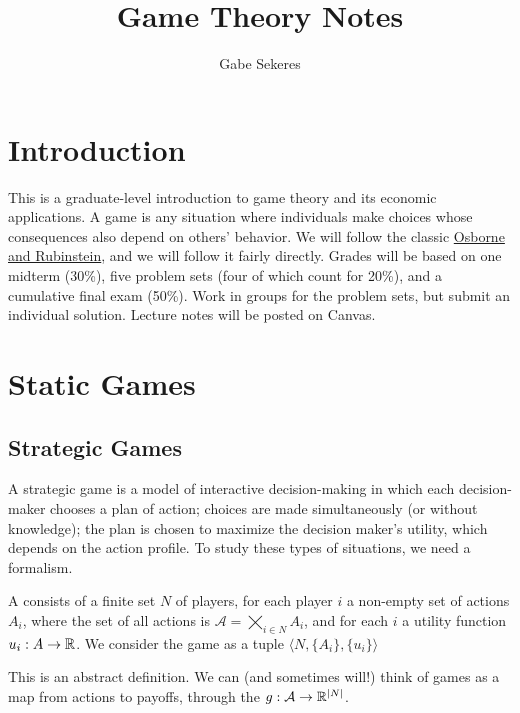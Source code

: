 \documentclass[10pt]{article}
\title{Game Theory Notes}
\author{Gabe Sekeres}
\begin{document}
\maketitle

\tableofcontents
\newpage


\section*{Introduction}

This is a graduate-level introduction to game theory and its economic applications. A game is any situation where individuals make choices whose consequences also depend on others' behavior. We will follow the classic \href{https://mitpress.mit.edu/9780262650403/a-course-in-game-theory/}{Osborne and Rubinstein}, and we will follow it fairly directly. Grades will be based on one midterm (30\%), five problem sets (four of which count for 20\%), and a cumulative final exam (50\%). Work in groups for the problem sets, but submit an individual solution. Lecture notes will be posted on Canvas.

\section{Static Games}

\subsection{Strategic Games}

A strategic game is a model of interactive decision-making in which each decision-maker chooses a plan of action; choices are made simultaneously (or without knowledge); the plan is chosen to maximize the decision maker's utility, which depends on the action profile. To study these types of situations, we need a formalism.

\begin{definition}
	A  consists of a finite set $N$ of players, for each player $i$ a non-empty set of actions $A_i$, where the set of all actions is $\mathcal{A} = \bigtimes_{i\in N} A_i$, and for each $i$ a utility function $u_i : A \to \mathbb{R}$. We consider the game as a tuple $\langle N, \{A_i\}, \{u_i\}\rangle$
\end{definition}

This is an abstract definition. We can (and sometimes will!) think of games as a map from actions to payoffs, through the  $g: \mathcal{A} \to \mathbb{R}^{|N|}$.
\end{document}
